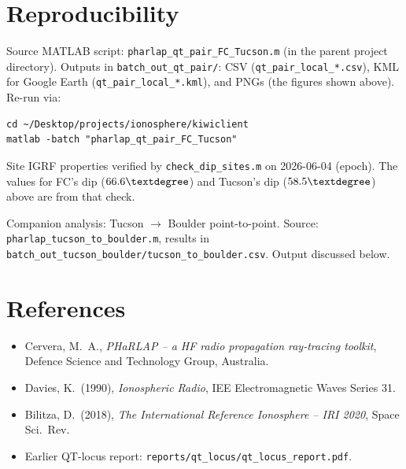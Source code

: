 \documentclass[11pt]{article}
\begin{document}
\section*{Reproducibility}

Source MATLAB script: \texttt{pharlap\_qt\_pair\_FC\_Tucson.m}
(in the parent project directory).  Outputs in
\texttt{batch\_out\_qt\_pair/}:
CSV (\texttt{qt\_pair\_local\_*.csv}), KML for Google Earth
(\texttt{qt\_pair\_local\_*.kml}), and PNGs (the figures shown
above).  Re-run via:
\begin{verbatim}
cd ~/Desktop/projects/ionosphere/kiwiclient
matlab -batch "pharlap_qt_pair_FC_Tucson"
\end{verbatim}

Site IGRF properties verified by
\texttt{check\_dip\_sites.m} on 2026-06-04 (epoch).  The values for
FC's dip ($66.6\textdegree$) and Tucson's dip ($58.5\textdegree$)
above are from that check.

Companion analysis: Tucson $\to$ Boulder point-to-point.  Source:
\texttt{pharlap\_tucson\_to\_boulder.m}, results in
\texttt{batch\_out\_tucson\_boulder/tucson\_to\_boulder.csv}.  Output
discussed below.


\section*{References}

\begin{itemize}
\item Cervera, M.~A., \emph{PHaRLAP -- a HF radio propagation
ray-tracing toolkit}, Defence Science and Technology Group,
Australia.
\item Davies, K.\ (1990), \emph{Ionospheric Radio}, IEE
Electromagnetic Waves Series 31.
\item Bilitza, D.\ (2018), \emph{The International Reference
Ionosphere -- IRI 2020}, Space Sci.\ Rev.
\item Earlier QT-locus report:
\texttt{reports/qt\_locus/qt\_locus\_report.pdf}.
\end{itemize}
\end{document}
